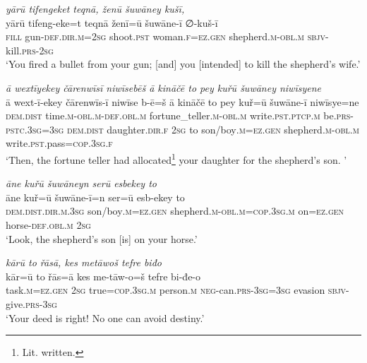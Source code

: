 \ea \label{KŠ.98}
\textit{yārū tifengeket teqnā, ženū šuwāney kušī,} \\ 
\gll yārū tifeng-eke=t teqnā ženī=ū šuwāne-ī ∅-kuš-ī \\ 
 \textsc{fill} gun\textsc{-def}\textsc{.dir}\textsc{.m}\textsc{=\textsc{2sg}} shoot\textsc{.pst} woman\textsc{.f}\textsc{\textsc{=ez.gen}} shepherd\textsc{.m}\textsc{-obl}\textsc{.m} \textsc{sbjv-}kill\textsc{.prs}-\textsc{2sg} \\ 
\glt `You fired a bullet from your gun; [and] you [intended] to kill the shepherd’s wife.'
\z 
 
\ea \label{KŠ.99}
\textit{ā wextīyekey čārenwīsī niwīsebēš ā kināčē to pey kuřū šuwāney niwīsyene} \\ 
\gll ā wext-ī-ekey čārenwīs-ī niwīse b-ē=š ā kināčē to pey kuř=ū šuwāne-ī niwīsye=ne \\ 
 \textsc{dem.dist} time\textsc{.m}\textsc{-obl}\textsc{.m}\textsc{-def}\textsc{.obl}\textsc{.m} fortune\_teller\textsc{.m}\textsc{-obl}\textsc{.m} write\textsc{.pst}\textsc{.ptcp}\textsc{.m} be\textsc{.prs}\textsc{-pstc}\textsc{.3sg}\textsc{=3sg} \textsc{dem.dist} daughter\textsc{.dir}\textsc{.f} \textsc{2sg} to son/boy\textsc{.m}\textsc{\textsc{=ez.gen}} shepherd\textsc{.m}\textsc{-obl}\textsc{.m} write\textsc{.pst}.pass\textsc{=cop}\textsc{.3sg}\textsc{.f} \\ 
\glt `Then, the fortune teller had allocated\footnote{Lit. written.} your daughter for the shepherd’s son. '
\z 
 
\ea \label{KŠ.100}
\textit{āne kuřū šuwāneyn serū esbekey to} \\ 
\gll āne kuř=ū šuwāne-ī=n ser=ū esb-ekey to \\ 
 \textsc{dem.dist}\textsc{.dir}\textsc{.m}\textsc{.3sg} son/boy\textsc{.m}\textsc{\textsc{=ez.gen}} shepherd\textsc{.m}\textsc{-obl}\textsc{.m}\textsc{=cop}\textsc{.3sg}\textsc{.m} on\textsc{\textsc{=ez.gen}} horse\textsc{-def}\textsc{.obl}\textsc{.m} \textsc{2sg} \\ 
\glt `Look, the shepherd’s son [is] on your horse.'
\z 
 
\ea \label{KŠ.105}
\textit{kārū to řāsā, kes metāwoš tefre biđo} \\ 
\gll kār=ū to řās=ā kes me-tāw-o=š tefre bi-đe-o \\ 
 task\textsc{.m}\textsc{\textsc{=ez.gen}} \textsc{2sg} true\textsc{=cop}\textsc{.3sg}\textsc{.m} person\textsc{.m} \textsc{neg-}can\textsc{.prs}\textsc{-3sg}\textsc{=3sg} evasion \textsc{sbjv-}give\textsc{.prs}\textsc{-3sg} \\ 
\glt `Your deed is right! No one can avoid destiny.'
\z 
 
